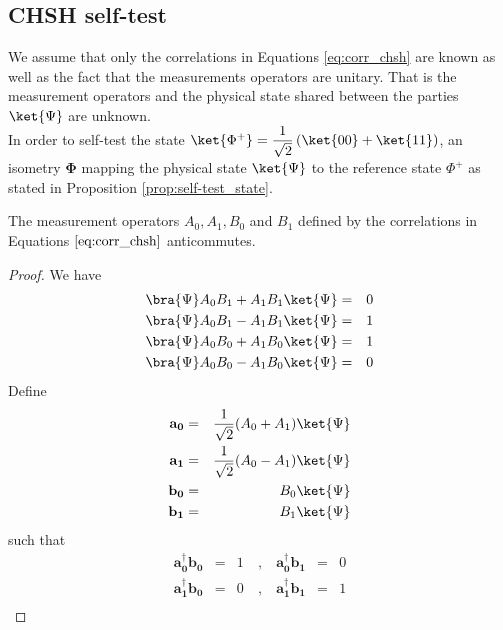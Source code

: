 \subsection*{CHSH self-test}

We assume that only the correlations in Equations \ref{eq:corr_chsh} are known as well as the fact that the measurements operators are unitary.
That is the measurement operators and the physical state shared between the
parties $\ket{\Psi}$ are unknown. \\

In order to self-test the state $\ket{\Phi^+} = \dfrac{1}{\sqrt{2}} \left(
\ket{00} +\ket{11}\right) $, an isometry $\mathbf{\Phi}$ mapping the physical
state $\ket{\Psi}$ to the reference state $\Phi^+$ as stated in Proposition
\ref{prop:self-test_state}.

\begin{proposition}[Anticommutativity] The measurement operators $A_0, A_1, B_0$
and $B_1$ defined by the correlations in Equations $\ref{eq:corr_chsh}$
anticommutes.
\end{proposition}

\begin{proof}
We have 
\begin{equation*}
    \begin{aligned}
    \bra{\Psi} A_0 B_1 + A_1 B_1 \ket{\Psi} &=& 0  \\
    \bra{\Psi} A_0 B_1 - A_1 B_1 \ket{\Psi} &=& 1  \\
    \bra{\Psi} A_0 B_0+ A_1 B_0 \ket{\Psi} &=& 1  \\
    \bra{\Psi} A_0 B_0- A_1 B_0 \ket{\Psi} &=& 0  \\
    \end{aligned}
\end{equation*}
Define 
\begin{equation*}
    \begin{aligned}
    \mathbf{a_0} &=& \dfrac{1}{\sqrt{2}}(A_0 + A_1) \ket{\Psi} \\ 
    \mathbf{a_1} &=& \dfrac{1}{\sqrt{2}}(A_0 - A_1) \ket{\Psi} \\ 
    \mathbf{b_0} &=& B_0 \ket{\Psi} \\
    \mathbf{b_1} &=& B_1 \ket{\Psi} \\
    \end{aligned}
\end{equation*}
such that 
\begin{equation*}
    \begin{aligned}
    \mathbf{a_0^\dagger}  \mathbf{b_0}  &=& 1   &\ ,\ & \mathbf{a_0^\dagger}   \mathbf{b_1} &=& 0 \\
    \mathbf{a_1^\dagger}  \mathbf{b_0}  &=& 0  &\ ,\ & \mathbf{a_1^\dagger}   \mathbf{b_1} &=& 1 \\
    \end{aligned}
\end{equation*}
\end{proof}

